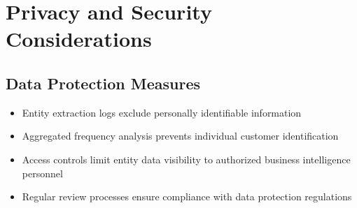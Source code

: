 \documentclass[11pt]{article}
\begin{document}
\section{Privacy and Security Considerations}

\subsection{Data Protection Measures}
\begin{itemize}
\item Entity extraction logs exclude personally identifiable information
\item Aggregated frequency analysis prevents individual customer identification
\item Access controls limit entity data visibility to authorized business intelligence personnel
\item Regular review processes ensure compliance with data protection regulations
\end{itemize}
\end{document}
